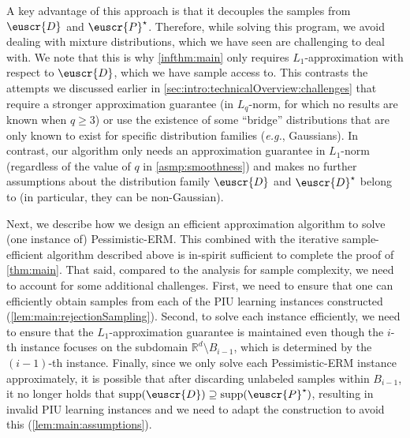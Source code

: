 \documentclass[11pt]{article}
\theoremstyle{plain}
\theoremstyle{definition}
\theoremstyle{remark}
\newcommand{\R}{\mathbb{R}}
\newcommand{\supp}{\operatorname{supp}}
\newcommand{\customcal}[1]{\euscr{#1}}
\newcommand{\cD}{\customcal{D}}
\newcommand{\cP}{\customcal{P}}
\newcommand{\eg}{\textit{e.g.}}
\newcommand{\pERM}{Pessimistic-ERM}
\newcommand{\cDtrue}{\cD^\star}
\newcommand{\cPtrue}{\cP^\star}
\newcommand{\nL}{L}
\begin{document}
            A key advantage of this approach is that it decouples the samples from $\cD$ and $\cPtrue$.
            Therefore, while solving this program, we avoid dealing with mixture distributions, which we have seen are challenging to deal with.
            We note that this is why \cref{infthm:main} only requires $\nL_1$-approximation with respect to $\cD$, which we have sample access to.
            This contrasts the attempts we discussed earlier in \cref{sec:intro:technicalOverview:challenges} that require a stronger approximation guarantee (in $\nL_q$-norm, for which no results are known when $q \geq 3$) or use the existence of some ``bridge'' distributions that are only known to exist for specific distribution families (\eg{}, Gaussians).  
            In contrast, our algorithm only needs an approximation guarantee in $\nL_1$-norm (regardless of the value of $q$ in \cref{asmp:smoothness}) and makes no further assumptions about the distribution family $\cD$ and $\cDtrue$ belong to (in particular, they can be non-Gaussian). 

            
            Next, we describe how we design an efficient approximation algorithm to solve (one instance of) \pERM{}. 
            This combined with the iterative sample-efficient algorithm described above is in-spirit sufficient to complete the proof of \cref{thm:main}.
            That said, compared to the analysis for sample complexity, we need to account for some additional challenges.
                First, we need to ensure that one can efficiently obtain samples from each of the PIU learning instances constructed (\cref{lem:main:rejectionSampling}). 
                Second, to solve each instance efficiently, we need to ensure that the $L_1$-approximation guarantee is maintained even though the $i$-th instance focuses on the subdomain $\R^d\setminus B_{i-1}$, which is determined by the $(i-1)$-th instance.
                Finally, since we only solve each \pERM{} instance approximately, it is possible that after discarding unlabeled samples within $B_{i-1}$, it no longer holds that $\supp(\cD)\supseteq \supp(\cPtrue)$, resulting in invalid PIU learning instances and we need to adapt the construction to avoid this (\cref{lem:main:assumptions}).
\end{document}
